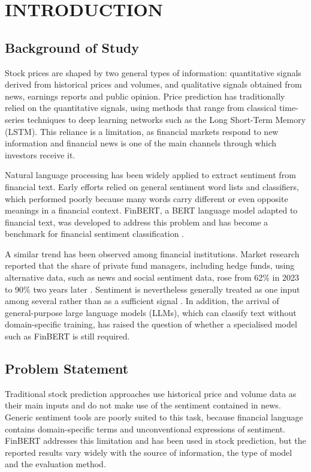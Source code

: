 \chapter{INTRODUCTION}

\section{Background of Study}
Stock prices are shaped by two general types of information: quantitative signals derived from historical prices and volumes, and qualitative signals obtained from news, earnings reports and public opinion. Price prediction has traditionally relied on the quantitative signals, using methods that range from classical time-series techniques to deep learning networks such as the Long Short-Term Memory (LSTM). This reliance is a limitation, as financial markets respond to new information and financial news is one of the main channels through which investors receive it.

Natural language processing has been widely applied to extract sentiment from financial text. Early efforts relied on general sentiment word lists and classifiers, which performed poorly because many words carry different or even opposite meanings in a financial context. FinBERT, a BERT language model adapted to financial text, was developed to address this problem and has become a benchmark for financial sentiment classification \parencite{araci2019finbert}.

A similar trend has been observed among financial institutions. Market research reported that the share of private fund managers, including hedge funds, using alternative data, such as news and social sentiment data, rose from 62\% in 2023 to 90\% two years later \parencite{lowenstein2025alternative}. Sentiment is nevertheless generally treated as one input among several rather than as a sufficient signal \parencite{aima2024casting}. In addition, the arrival of general-purpose large language models (LLMs), which can classify text without domain-specific training, has raised the question of whether a specialised model such as FinBERT is still required.

\section{Problem Statement}
Traditional stock prediction approaches use historical price and volume data as their main inputs and do not make use of the sentiment contained in news. Generic sentiment tools are poorly suited to this task, because financial language contains domain-specific terms and unconventional expressions of sentiment. FinBERT addresses this limitation and has been used in stock prediction, but the reported results vary widely with the source of information, the type of model and the evaluation method.

